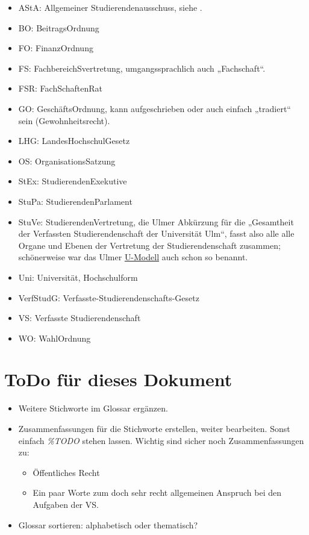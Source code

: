 \documentclass[
10pt,
a4paper,
twoside,								%
titlepage=false,							%
draft=false								%
]{scrartcl}
\begin{document}
\begin{itemize}
	\item AStA: Allgemeiner Studierendenausschuss, siehe .
	\item BO: BeitragsOrdnung
	\item FO: FinanzOrdnung
	\item FS: FachbereichSvertretung, umgangssprachlich auch „Fachschaft“.
	\item FSR: FachSchaftenRat
	\item GO: GeschäftsOrdnung, kann aufgeschrieben oder auch einfach „tradiert“ sein (Gewohnheitsrecht).
	\item LHG: LandesHochschulGesetz
	\item OS: OrganisationsSatzung
	\item StEx: StudierendenExekutive
	\item StuPa: StudierendenParlament
	\item StuVe: StudierendenVertretung, die Ulmer Abkürzung für die „Gesamtheit der Verfassten Studierendenschaft der Universität Ulm“, fasst also alle alle Organe und Ebenen der Vertretung der Studierendenschaft zusammen; schönerweise war das Ulmer \href{https://de.wikipedia.org/wiki/Unabh\%C3\%A4ngige_Studierendenschaft}{U-Modell} auch schon so benannt.
	\item Uni: Universität, Hochschulform
	\item VerfStudG: Verfasste-Studierendenschafts-Gesetz
	\item VS: Verfasste Studierendenschaft
	\item WO: WahlOrdnung
\end{itemize}

\section*{ToDo für dieses Dokument}

\begin{itemize}
	\item Weitere Stichworte im Glossar ergänzen.
	\item Zusammenfassungen für die Stichworte erstellen, weiter bearbeiten. Sonst einfach \textit{\%TODO} stehen lassen. Wichtig sind sicher noch Zusammenfassungen zu:
	\begin{itemize}
		\item Öffentliches Recht
		\item Ein paar Worte zum doch sehr recht allgemeinen Anspruch bei den Aufgaben der VS.
	\end{itemize}
	\item Glossar sortieren: alphabetisch oder thematisch?
\end{itemize}
\end{document}
